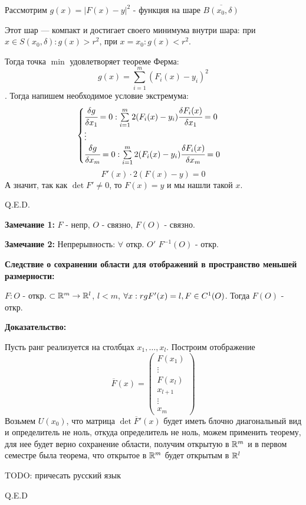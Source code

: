 Рассмотрим $g(x) = |F(x)-y|^2$ - функция на шаре $\overline{B(x_0,\delta)}$

Этот шар --- компакт и достигает своего минимума внутри шара: при $x \in S(x_0,\delta):g(x) >r^2$, при $x = x_0: g(x)<r^2$.

Тогда точка $\min$ удовлетворяет теореме Ферма:
$$g(x) = \sum\limits_{i=1}^m (F_i(x)-y_i)^2$$. 
Тогда напишем необходимое условие экстремума:
$$\begin{cases}
    \cfrac{\delta g}{\delta x_1}=0: \sum\limits_{i=1}^m 2 (F_i(x)-y_i)\cfrac{\delta F_i(x)}{\delta x_1}=0\\
    \vdots \\
    \cfrac{\delta g}{\delta x_m}=0: \sum\limits_{i=1}^m 2 (F_i(x)-y_i)\cfrac{\delta F_i(x)}{\delta x_m}=0
\end{cases}$$
$$F'(x) \cdot 2(F(x)-y) = 0$$
А значит, так как $\det F'\neq 0$, то $F(x) = y$ и мы нашли такой $x$.

\hfill Q.E.D.

\textbf{Замечание 1:} $F$ - непр, $O$ - связно, $F(O)$ - связно.

\textbf{Замечание 2:} Непрерывность: $\forall$ откр. $O'$ $F^{-1}(O)$ - откр.

\textbf{Следствие о сохранении области для отображений в пространство меньшей размерности:} 

$F: O$ - откр. $\subset \mathbb{R}^m \rightarrow \mathbb{R}^l$, $l<m$, $\forall x : rg F'(x) = l, F \in C^1(O)$. Тогда $F(O)$ - откр.

\textbf{Доказательство:}

Пусть ранг реализуется на столбцах $x_1,\ldots , x_l$. Построим отображение 
$$\overline{F}(x) = \begin{pmatrix}
    F(x_1)\\
    \vdots\\
    F(x_l)\\
    x_{l+1}\\
    \vdots \\
    x_{m}
\end{pmatrix}$$
Возьмем $U(x_0)$, что матрица $\det \overline{F}'(x)$ будет иметь блочно диагональный вид и определитель не ноль, откуда определитель не ноль, можем применить теорему, для нее будет верно сохранение области, получим открытую в $\mathbb{R}^m$ и в первом семестре была теорема, что открытое в $\mathbb{R}^m$ будет открытым в $\mathbb{R}^l$

TODO: причесать русский язык

\hfill Q.E.D



